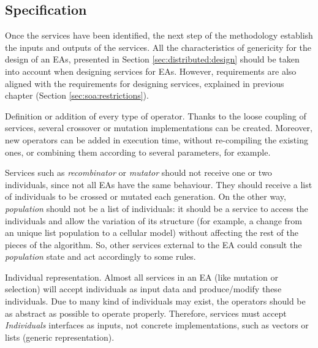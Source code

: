 \subsection{Specification}

Once the services have been identified, the next step of the methodology establish the inputs and outputs of the services. All the characteristics of genericity for the design of an EAs, presented in Section \ref{sec:distributed:design} should be taken into account when designing services for EAs. However, requirements are also aligned with the requirements for designing services, explained in previous chapter (Section \ref{sec:soa:restrictions}).

Definition or addition of every type of operator. %
Thanks to the loose coupling of services, several crossover or
mutation implementations can be created. %
Moreover, new operators can be added in execution time, without
re-compiling the existing ones, or combining them according to several
parameters, for example. %

 Services such as 
{\em recombinator} or {\em mutator} should not receive one or two
individuals, since not all EAs have the same behaviour. They should receive a
list of individuals to be crossed or mutated each generation. On the other way,
{\em population} should not be a list of individuals: it should be a service
to access the individuals and allow the variation of its structure (for example, a change
from an unique list population to a cellular model) without
affecting  the rest of the pieces of the algorithm. So, other services
external to the EA could consult the {\em population} state and act
accordingly to some rules. 

Individual representation. Almost all services in an EA (like mutation or selection) will accept individuals as input data and produce/modify these individuals. Due to many kind of individuals may exist, the operators should be as abstract as possible to operate properly. Therefore, services must accept {\em Individuals} interfaces as inputs, not concrete implementations, such as vectors or lists (generic representation). 




